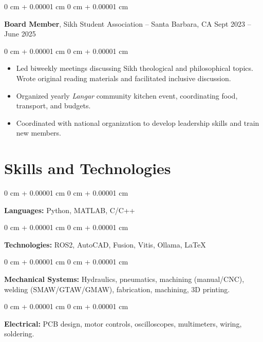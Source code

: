 \documentclass[10pt, letterpaper]{article}
\newenvironment{highlights}{
    \begin{itemize}[
        topsep=0.10 cm,
        parsep=0.10 cm,
        partopsep=0pt,
        itemsep=0pt,
        leftmargin=0 cm + 10pt
    ]
}{
    \end{itemize}
} %
\newenvironment{onecolentry}{
    \begin{adjustwidth}{
        0 cm + 0.00001 cm
    }{
        0 cm + 0.00001 cm
    }
}{
    \end{adjustwidth}
} %
\newenvironment{twocolentry}[2][]{
    \onecolentry
    \def\secondColumn{#2}
    \setcolumnwidth{\fill, 4.5 cm}
    \begin{paracol}{2}
}{
    \switchcolumn \raggedleft \secondColumn
    \end{paracol}
    \endonecolentry
} %
\begin{document}
        \vspace{0.2 cm}

        \begin{twocolentry}{
            Sept 2023 – June 2025
        }
            \textbf{Board Member}, Sikh Student Association -- Santa Barbara, CA \end{twocolentry}

        \vspace{0.10 cm}
        \begin{onecolentry}
            \begin{highlights}
                \item Led biweekly meetings discussing Sikh theological and philosophical topics. Wrote original reading materials and facilitated  inclusive discussion.
                \item Organized yearly \textit{Langar} community kitchen event, coordinating food, transport, and budgets.
                \item Coordinated with national organization to develop leadership skills and train new members.
            \end{highlights}
        \end{onecolentry}

    \section{Skills and Technologies}

        \begin{onecolentry}
            \textbf{Languages:} Python, MATLAB, C/C++
        \end{onecolentry}

        \vspace{0.1 cm}

        \begin{onecolentry}
            \textbf{Technologies:} ROS2, AutoCAD, Fusion, Vitis, Ollama, \LaTeX
        \end{onecolentry}
        
        \vspace{0.1 cm}

        \begin{onecolentry}
            \textbf{Mechanical Systems:} Hydraulics, pneumatics, machining (manual/CNC), welding (SMAW/GTAW/GMAW), fabrication, machining, 3D printing. 
        \end{onecolentry}

        \vspace{0.1 cm}

        \begin{onecolentry}
            \textbf{Electrical:} PCB design, motor controls, oscilloscopes, multimeters, wiring, soldering.
        \end{onecolentry}
\end{document}
